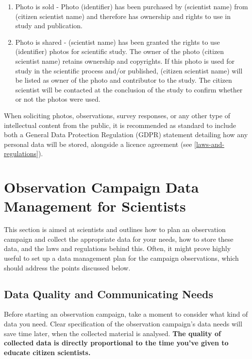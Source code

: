 \documentclass{article}
\begin{document}
\begin{enumerate}
    \item Photo is sold - 
Photo (identifier) has been purchased by (scientist name) from (citizen scientist name) and therefore has ownership and rights to use in study and publication.
\item Photo is shared - (scientist name) has been granted the rights to use (identifier) photos for scientific study.  The owner of the photo (citizen scientist name) retains ownership and copyrights.  If this photo is used for study in the scientific process and/or published, (citizen scientist name) will be listed as owner of the photo and contributor to the study. The citizen scientist will be contacted at the conclusion of the study to confirm whether or not the photos were used.
\end{enumerate}

When soliciting photos, observations, survey responses, or any other type of intellectual content from the public, it is recommended as standard to include both a General Data Protection Regulation (GDPR) statement detailing how any personal data will be stored, alongside a licence agreement (see \ref{laws-and-regulations}).





\section{Observation Campaign Data Management for Scientists}\label{data_sci}
This section is aimed at scientists and outlines how to plan an observation campaign and collect the appropriate data for your needs, how to store these data, and the laws and regulations behind this. Often, it might prove highly useful to set up a data management plan for the campaign observations, which should address the points discussed below.

\subsection{Data Quality and Communicating Needs}\label{data_quality}

Before starting an observation campaign, take a moment to consider what kind of data you need. Clear specification of the observation campaign's data needs will save time later, when the collected material is analysed. \textbf{The quality of collected data is directly proportional to the time you've given to educate citizen scientists.} 
\end{document}
